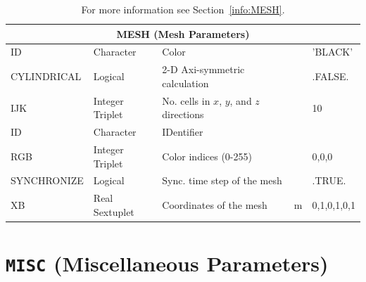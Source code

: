 \documentclass[11pt]{book}
\begin{document}
\begin{table}[H]
\caption{For more information see Section~\ref{info:MESH}.}\label{tbl:MESH}
\noindent
\begin{tabular*}{\textwidth}{@{\extracolsep{\fill}}|l|l|l|l|l|}
\hline
\multicolumn{5}{|c|}{{\ct MESH} (Mesh Parameters)} \\ \hline \hline
{\ct ID}          & Character                   & Color                                                 &    & {\ct 'BLACK'}                  \\ \hline
{\ct CYLINDRICAL} & Logical                     & 2-D Axi-symmetric calculation                         &    & {\ct .FALSE.}    \\ \hline
{\ct IJK}         & Integer Triplet             & No. cells in $x$, $y$, and $z$ directions             &    & 10               \\ \hline
{\ct ID}          & Character                   & IDentifier                                            &    &                  \\ \hline
{\ct RGB}         & Integer Triplet             & Color indices (0-255)                                 &    & 0,0,0               \\ \hline
{\ct SYNCHRONIZE} & Logical                     & Sync. time step of the mesh                           &    & {\ct .TRUE.}     \\ \hline
{\ct XB}          & Real Sextuplet              & Coordinates of the mesh                               & m  & 0,1,0,1,0,1      \\ \hline
\end{tabular*}
\end{table}

\vspace{\baselineskip}

\vfill


\section{\texorpdfstring{{\tt MISC}}{MISC} (Miscellaneous Parameters)}
\end{document}
